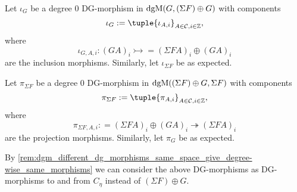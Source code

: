 \begin{remark}
    \label{rem:dgm_differentials_of_inclusions_and_projections_of_cone}
    Let \( \iota_G \) be a degree \( 0 \) DG-morphism in \( \operatorname{dgM}(G, (\Sigma F) \oplus G) \) with components
    \[
        \iota_G := \tuple{ \iota_{A, i} }_{A \in \Cc, i \in \Zb},
    \]
    where
    \[
        \iota_{G, A, i}: (G A)_i \rightarrowtail = (\Sigma F A)_i \oplus (G A)_i
    \]
    are the inclusion morphisms. Similarly, let \( \iota_{\Sigma F} \) be as expected.
    
    Let \( \pi_{\Sigma F} \) be a degree \( 0 \) DG-morphism in \( \operatorname{dgM}((\Sigma F) \oplus G, \Sigma F) \) with components
    \[
        \pi_{\Sigma F} := \tuple{ \pi_{A, i} }_{A \in \Cc, i \in \Zb},
    \]
    where
    \[
        \pi_{\Sigma F, A, i}: = (\Sigma F A)_i \oplus (G A)_i \twoheadrightarrow (\Sigma F A)_i
    \]
    are the projection morphisms. Similarly, let \( \pi_G \) be as expected.

    By \autoref{rem:dgm_different_dg_morphisms_same_space_give_degree-wise_same_morphisms} we can consider the above DG-morphisms as DG-morphisms to and from \( C_{\eta} \) instead of \( (\Sigma F) \oplus G \).


\end{remark}
